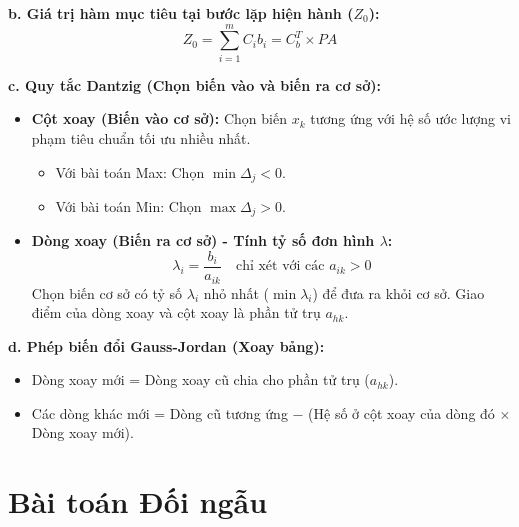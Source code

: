 \textbf{b. Giá trị hàm mục tiêu tại bước lặp hiện hành ($Z_0$):}
\begin{equation}
    Z_0 = \sum_{i=1}^{m} C_i b_i = C_b^T \times PA
\end{equation}

\textbf{c. Quy tắc Dantzig (Chọn biến vào và biến ra cơ sở):}
\begin{itemize}
    \item \textbf{Cột xoay (Biến vào cơ sở):} Chọn biến $x_k$ tương ứng với hệ số ước lượng vi phạm tiêu chuẩn tối ưu nhiều nhất.
    \begin{itemize}
        \item Với bài toán Max: Chọn $\min \Delta_j < 0$.
        \item Với bài toán Min: Chọn $\max \Delta_j > 0$.
    \end{itemize}
    \item \textbf{Dòng xoay (Biến ra cơ sở) - Tính tỷ số đơn hình $\lambda$:}
    \begin{equation}
        \lambda_i = \frac{b_i}{a_{ik}} \quad \text{chỉ xét với các } a_{ik} > 0
    \end{equation}
    Chọn biến cơ sở có tỷ số $\lambda_i$ nhỏ nhất ($\min \lambda_i$) để đưa ra khỏi cơ sở. Giao điểm của dòng xoay và cột xoay là phần tử trụ $a_{hk}$.
\end{itemize}

\textbf{d. Phép biến đổi Gauss-Jordan (Xoay bảng):}
\begin{itemize}
    \item Dòng xoay mới = Dòng xoay cũ chia cho phần tử trụ ($a_{hk}$).
    \item Các dòng khác mới = Dòng cũ tương ứng $-$ (Hệ số ở cột xoay của dòng đó $\times$ Dòng xoay mới).
\end{itemize}

\section{Bài toán Đối ngẫu}
